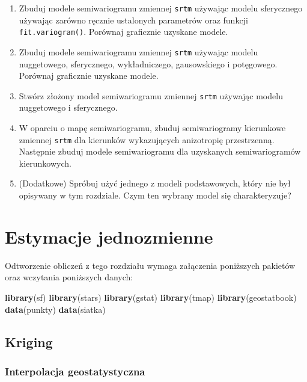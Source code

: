 \documentclass[
  paper=6in:9in,pagesize=pdftex,headinclude=on,footinclude=on,10pt]{scrbook}
\newenvironment{Shaded}{\begin{snugshade}}{\end{snugshade}}
\newcommand{\FunctionTok}[1]{\textcolor[rgb]{0.13,0.29,0.53}{\textbf{#1}}}
\newcommand{\NormalTok}[1]{#1}
\providecommand{\tightlist}{%
  \setlength{\itemsep}{0pt}\setlength{\parskip}{0pt}}
\begin{document}
\begin{enumerate}
\def\labelenumi{\arabic{enumi}.}
\tightlist
\item
  Zbuduj modele semiwariogramu zmiennej \texttt{srtm} używając modelu sferycznego używając zarówno ręcznie ustalonych parametrów oraz funkcji \texttt{fit.variogram()}.
  Porównaj graficznie uzyskane modele.
\item
  Zbuduj modele semiwariogramu zmiennej \texttt{srtm} używając modelu nuggetowego, sferycznego, wykładniczego, gausowskiego i potęgowego.
  Porównaj graficznie uzyskane modele.
\item
  Stwórz złożony model semiwariogramu zmiennej \texttt{srtm} używając modelu nuggetowego i sferycznego.
\item
  W oparciu o mapę semiwariogramu, zbuduj semiwariogramy kierunkowe zmiennej \texttt{srtm} dla kierunków wykazujących anizotropię przestrzenną.
  Następnie zbuduj modele semiwariogramu dla uzyskanych semiwariogramów kierunkowych.
\item
  (Dodatkowe) Spróbuj użyć jednego z modeli podstawowych, który nie był opisywany w tym rozdziale.
  Czym ten wybrany model się charakteryzuje?
\end{enumerate}

\chapter{Estymacje jednozmienne}\label{estymacje-jednozmienne}

Odtworzenie obliczeń z tego rozdziału wymaga załączenia poniższych pakietów oraz wczytania poniższych danych:

\begin{Shaded}
\begin{Highlighting}[]
\FunctionTok{library}\NormalTok{(sf)}
\FunctionTok{library}\NormalTok{(stars)}
\FunctionTok{library}\NormalTok{(gstat)}
\FunctionTok{library}\NormalTok{(tmap)}
\FunctionTok{library}\NormalTok{(geostatbook)}
\FunctionTok{data}\NormalTok{(punkty)}
\FunctionTok{data}\NormalTok{(siatka)}
\end{Highlighting}
\end{Shaded}

\section{Kriging}\label{kriging}

\subsection{Interpolacja geostatystyczna}\label{interpolacja-geostatystyczna}
\end{document}
